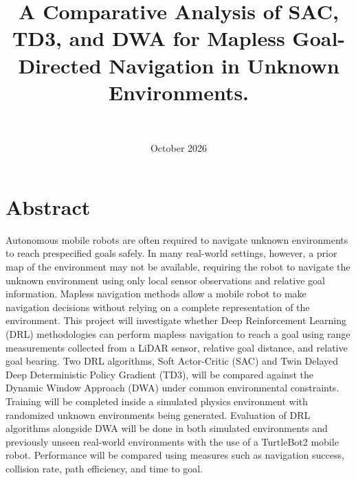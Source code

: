 \documentclass[conference]{IEEEtran}
\title{A Comparative Analysis of SAC, TD3, and DWA for Mapless Goal-Directed Navigation in Unknown Environments.}
\author{
\IEEEauthorblockA{CSCI 5551: Introduction to Intelligent Robotic Systems}
    \IEEEauthorblockN{Ketan Inampudi (inamp005@umn.edu), Alec Olson (ols00160@umn.edu)} \\
}
\date{October 2026}
\begin{document}
\maketitle

\section{Abstract}
Autonomous mobile robots are often required to navigate unknown environments to reach prespecified goals safely. 
In many real-world settings, however, a prior map of the environment may not be available, requiring the robot to navigate the unknown environment using only local sensor observations and relative goal information.
Mapless navigation methods allow a mobile robot to make navigation decisions without relying on a complete representation of the environment. 
This project will investigate whether Deep Reinforcement Learning (DRL) methodologies can perform mapless navigation to reach a goal using range measurements collected from a LiDAR sensor, relative goal distance, and relative goal bearing. 
Two DRL algorithms, Soft Actor-Critic (SAC) and Twin Delayed Deep Deterministic Policy Gradient (TD3), will be compared against the Dynamic Window Approach (DWA) under common environmental constraints. 
Training will be completed inside a simulated physics environment with randomized unknown environments being generated. Evaluation of DRL algorithms alongside DWA will be done in both simulated environments and previously unseen real-world environments with the use of a TurtleBot2 mobile robot. 
Performance will be compared using measures such as navigation success, collision rate, path efficiency, and time to goal.
\end{document}
